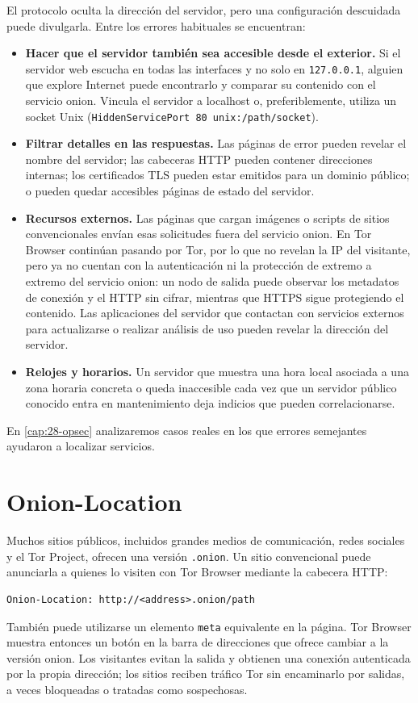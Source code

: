 El protocolo oculta la dirección del servidor, pero una configuración descuidada puede divulgarla. Entre los errores habituales se encuentran:
\begin{itemize}
  \item \textbf{Hacer que el servidor también sea accesible desde el exterior.} Si el servidor web escucha en todas las interfaces y no solo en \texttt{127.0.0.1}, alguien que explore Internet puede encontrarlo y comparar su contenido con el servicio onion. Vincula el servidor a localhost o, preferiblemente, utiliza un socket Unix (\texttt{HiddenServicePort 80 unix:/path/socket}).
  \item \textbf{Filtrar detalles en las respuestas.} Las páginas de error pueden revelar el nombre del servidor; las cabeceras HTTP pueden contener direcciones internas; los certificados TLS pueden estar emitidos para un dominio público; o pueden quedar accesibles páginas de estado del servidor.
  \item \textbf{Recursos externos.} Las páginas que cargan imágenes o scripts de sitios convencionales envían esas solicitudes fuera del servicio onion. En Tor Browser continúan pasando por Tor, por lo que no revelan la IP del visitante, pero ya no cuentan con la autenticación ni la protección de extremo a extremo del servicio onion: un nodo de salida puede observar los metadatos de conexión y el HTTP sin cifrar, mientras que HTTPS sigue protegiendo el contenido. Las aplicaciones del servidor que contactan con servicios externos para actualizarse o realizar análisis de uso pueden revelar la dirección del servidor.
  \item \textbf{Relojes y horarios.} Un servidor que muestra una hora local asociada a una zona horaria concreta o queda inaccesible cada vez que un servidor público conocido entra en mantenimiento deja indicios que pueden correlacionarse.
\end{itemize}
En \cref{cap:28-opsec} analizaremos casos reales en los que errores semejantes ayudaron a localizar servicios.

\section{Onion-Location}\label{sec:onionp-location}

Muchos sitios públicos, incluidos grandes medios de comunicación, redes sociales y el Tor Project, ofrecen una versión \texttt{.onion}. Un sitio convencional puede anunciarla a quienes lo visiten con Tor Browser mediante la cabecera HTTP:
\begin{lstlisting}[numbers=none]
Onion-Location: http://<address>.onion/path
\end{lstlisting}
También puede utilizarse un elemento \texttt{meta} equivalente en la página. Tor Browser muestra entonces un botón en la barra de direcciones que ofrece cambiar a la versión onion. Los visitantes evitan la salida y obtienen una conexión autenticada por la propia dirección; los sitios reciben tráfico Tor sin encaminarlo por salidas, a veces bloqueadas o tratadas como sospechosas.

